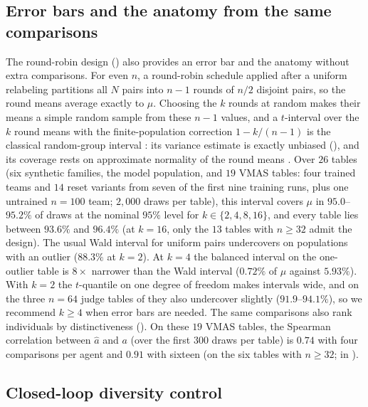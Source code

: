 \documentclass[twoside,11pt]{article}
\begin{document}


\subsection{Error bars and the anatomy from the same comparisons}
\label{sec:exp-ci}

The round-robin design () also provides an error
bar and the anatomy without extra comparisons. For even $n$, a round-robin schedule applied after a
uniform relabeling partitions all $N$ pairs into $n-1$ rounds of $n/2$
disjoint pairs, so the
round means average exactly to $\mu$. Choosing the $k$ rounds at random
makes their means a simple random sample from these $n-1$ values, and a
$t$-interval over the $k$ round means with the finite-population correction
$1-k/(n-1)$ is the classical random-group interval \citep{wolter2007introduction}:
its variance estimate is exactly unbiased (), and its
coverage rests on approximate normality of the round means \citep{hajek1960limiting}. Over $26$ tables (six synthetic
families, the model population, and $19$ VMAS tables: four trained teams
and $14$ reset variants from seven of the first nine training runs,
plus one untrained $n=100$ team; $2{,}000$
draws per table), this interval covers $\mu$ in $95.0$--$95.2\%$ of draws at the
nominal $95\%$ level for $k\in\{2,4,8,16\}$, and every table lies between
$93.6\%$ and $96.4\%$ (at $k=16$, only the $13$ tables with $n\ge 32$ admit
the design). The usual Wald interval for uniform pairs
undercovers on populations with an outlier ($88.3\%$ at $k=2$). At $k=4$
the balanced interval on the one-outlier table is $8\times$ narrower than the Wald interval
($0.72\%$ of $\mu$ against $5.93\%$). With $k=2$ the $t$-quantile on one
degree of freedom makes intervals wide, and on the three $n=64$ judge tables
of  they also undercover slightly ($91.9$--$94.1\%$), so
we recommend $k\ge4$ when error bars are needed. The same comparisons also rank individuals by
distinctiveness (). On these $19$ VMAS tables,
the Spearman correlation between $\widehat a$ and $a$ (over the first $300$
draws per table) is $0.74$ with four comparisons per agent and $0.91$ with
sixteen (on the six tables with $n\ge32$;  in
).

\subsection{Closed-loop diversity control}
\label{sec:exp-control}
\end{document}
